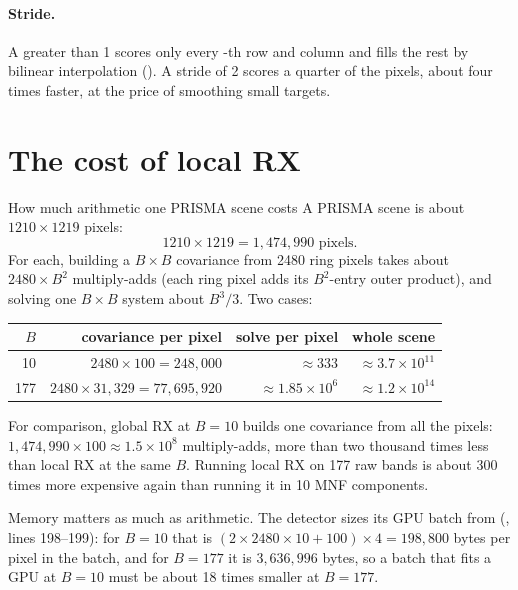\paragraph{Stride.} A  greater than 1 scores only every -th row and column and
fills the rest by bilinear interpolation (). A stride of 2 scores a quarter
of the pixels, about four times faster, at the price of smoothing small targets.

\section{The cost of local RX}\label{sec:localrx:cost}

\begin{worked}[label={we:localrx:cost}]{How much arithmetic one PRISMA scene costs}
A PRISMA scene is about $1210\times1219$ pixels:
\[
1210\times1219 = 1{,}474{,}990 \text{ pixels}.
\]
For each, building a $B\times B$ covariance from 2480 ring pixels takes about $2480\times B^2$
multiply-adds (each ring pixel adds its $B^2$-entry outer product), and solving one $B\times B$ system
about $B^3/3$. Two cases:
\begin{center}
\begin{tabular}{rrrr}
\toprule
$B$ & covariance per pixel & solve per pixel & whole scene\\
\midrule
10  & $2480\times100 = 248{,}000$          & $\approx 333$       & $\approx 3.7\times10^{11}$\\
177 & $2480\times31{,}329 = 77{,}695{,}920$ & $\approx 1.85\times10^{6}$ & $\approx 1.2\times10^{14}$\\
\bottomrule
\end{tabular}
\end{center}
For comparison, global RX at $B = 10$ builds one covariance from all the pixels:
$1{,}474{,}990\times100 \approx 1.5\times10^{8}$ multiply-adds, more than two thousand times less than
local RX at the same $B$. Running local RX on 177 raw bands is about 300 times more expensive again than
running it in 10 MNF components\tagC.

Memory matters as much as arithmetic. The detector sizes its GPU batch from
 (, lines 198--199): for
$B = 10$ that is $(2\times2480\times10 + 100)\times4 = 198{,}800$ bytes per pixel in the batch, and for
$B = 177$ it is $3{,}636{,}996$ bytes, so a batch that fits a GPU at $B = 10$ must be about 18 times
smaller at $B = 177$.
\end{worked}

